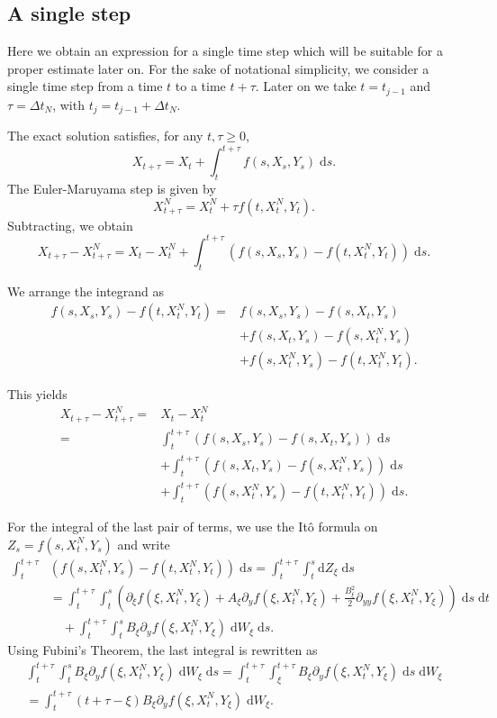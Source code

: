 \documentclass[reqno,12pt]{amsart}
\theoremstyle{plain}%
\theoremstyle{definition}
\begin{document}
\subsection{A single step}

Here we obtain an expression for a single time step which will be suitable for a proper estimate later on. For the sake of notational simplicity, we consider a single time step from a time $t$ to a time $t + \tau$. Later on we take $t=t_{j-1}$ and $\tau = \Delta t_N$, with $t_j = t_{j-1}+\Delta t_N$.

The exact solution satisfies, for any $t, \tau \geq 0$, 
$$
X_{t + \tau} = X_t + \int_t^{t + \tau} f(s, X_s, Y_s) \;\mathrm{d}s.
$$
The Euler-Maruyama step is given by
$$
X_{t+\tau}^N = X_t^N + \tau f(t, X_t^N, Y_t).
$$
Subtracting, we obtain
$$
X_{t + \tau} - X_{t + \tau}^N = X_t - X_t^N + \int_t^{t + \tau} \left( f(s, X_s, Y_s) - f(t, X_t^N, Y_t) \right)\;\mathrm{d}s.
$$

We arrange the integrand as
\begin{align*}
f(s, X_s, Y_s) - f(t, X_t^N, Y_t) = & f(s, X_s, Y_s) - f(s, X_t, Y_s) \\ 
 & + f(s, X_t, Y_s) - f(s, X_t^N, Y_s) \\
 & + f(s, X_t^N, Y_s) - f(t, X_t^N, Y_t).
\end{align*}

This yields
\begin{align*}
X_{t + \tau} - X_{t + \tau}^N  = & X_t - X_t^N \\
= &  \int_t^{t + \tau} \left( f(s, X_s, Y_s) - f(s, X_t, Y_s) \right)\;\mathrm{d}s \\ 
 & + \int_t^{t + \tau} \left( f(s, X_t, Y_s) - f(s, X_t^N, Y_s) \right)\;\mathrm{d}s \\
 & + \int_t^{t + \tau} \left( f(s, X_t^N, Y_s) - f(t, X_t^N, Y_t) \right)\;\mathrm{d}s.
\end{align*}

For the integral of the last pair of terms, we use the It\^o formula on $Z_s = f(s, X_t^N, Y_s)$ and write
\begin{align*}
\int_t^{t + \tau} & \left(f(s, X_t^N, Y_s) - f(t, X_t^N, Y_t) \right)\;\mathrm{d}s  = \int_t^{t + \tau} \int_t^s \mathrm{d}Z_\xi \;\mathrm{d}s \\
& = \int_t^{t + \tau} \int_t^s \left(\partial_\xi f(\xi, X_t^N, Y_\xi) + A_\xi \partial_y f(\xi, X_t^N, Y_\xi)  + \frac{B_\xi^2}{2}\partial_{yy}f(\xi, X_t^N, Y_\xi) \right) \;\mathrm{d}s\;\mathrm{d}t \\ 
& \quad + \int_t^{t + \tau} \int_t^s B_\xi \partial_y f(\xi, X_t^N, Y_\xi)\;\mathrm{d}W_\xi\;\mathrm{d}s.
\end{align*}
Using Fubini's Theorem, the last integral is rewritten as
\begin{multline}
\label{oldfubini}
\int_t^{t + \tau} \int_t^s B_\xi \partial_y f(\xi, X_t^N, Y_\xi)\;\mathrm{d}W_\xi\;\mathrm{d}s 
  = \int_t^{t + \tau} \int_\xi^{t + \tau} B_\xi \partial_y f(\xi, X_t^N, Y_\xi) \;\mathrm{d}s \;\mathrm{d}W_\xi \\
  = \int_t^{t+\tau} (t + \tau - \xi) B_\xi \partial_y f(\xi, X_t^N, Y_\xi) \;\mathrm{d}W_\xi.
\end{multline}
\end{document}
